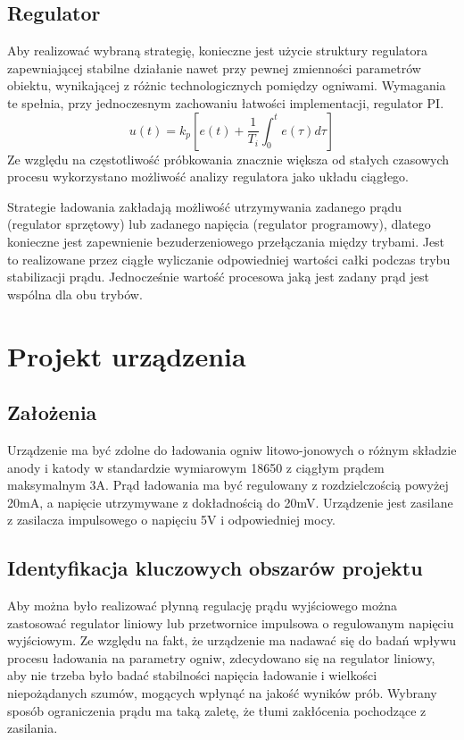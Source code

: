 \documentclass[polish,engineer]{polsl-msth}
\begin{document}
\section{Regulator}
Aby realizować wybraną strategię, konieczne jest użycie struktury regulatora zapewniającej stabilne działanie nawet przy pewnej zmienności parametrów obiektu, wynikającej z różnic technologicznych pomiędzy ogniwami. Wymagania te spełnia, przy jednoczesnym zachowaniu łatwości implementacji, regulator PI.
\begin{equation}
     u(t)=k_{p}\left[e(t)+{\frac {1}{T_{i}}}\int _{0}^{t}e(\tau )d\tau \right]
     \label{eq:PI_timebased}
\end{equation}
Ze względu na częstotliwość próbkowania znacznie większa od stałych czasowych procesu wykorzystano możliwość analizy regulatora jako układu ciągłego.

Strategie ładowania zakładają możliwość utrzymywania zadanego prądu (regulator sprzętowy) lub zadanego napięcia (regulator programowy), dlatego konieczne jest zapewnienie bezuderzeniowego przełączania między trybami. Jest to realizowane przez ciągłe wyliczanie odpowiedniej wartości całki podczas trybu stabilizacji prądu. Jednocześnie wartość procesowa jaką jest zadany prąd jest wspólna dla obu trybów.


\chapter{Projekt urządzenia}
\section{Założenia}
Urządzenie ma być zdolne do ładowania ogniw litowo-jonowych o różnym składzie anody i katody w standardzie wymiarowym 18650 z ciągłym prądem maksymalnym 3A. Prąd ładowania ma być regulowany z rozdzielczością powyżej 20mA, a napięcie utrzymywane z dokładnością do 20mV. Urządzenie jest zasilane z zasilacza impulsowego o napięciu 5V i odpowiedniej mocy.
\section{Identyfikacja kluczowych obszarów projektu}
Aby można było realizować płynną regulację prądu wyjściowego można zastosować regulator liniowy lub przetwornice impulsowa o regulowanym napięciu wyjściowym. Ze względu na fakt, że urządzenie ma nadawać się do badań wpływu procesu ładowania na parametry ogniw, zdecydowano się na regulator liniowy, aby nie trzeba było badać stabilności napięcia ładowanie i wielkości niepożądanych szumów, mogących wpłynąć na jakość wyników prób. Wybrany sposób ograniczenia prądu ma taką zaletę, że tłumi zakłócenia pochodzące z zasilania.
\end{document}
